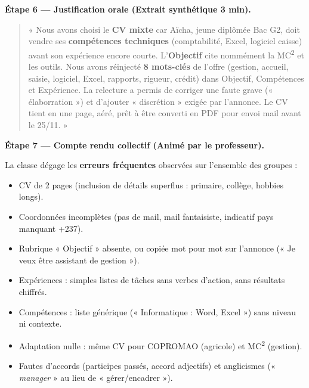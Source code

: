 \documentclass[11pt]{article}
\begin{document}
\begin{exoresolu}
\textbf{Étape 6 — Justification orale (Extrait synthétique 3 min).}

\begin{quote}
« Nous avons choisi le \textbf{CV mixte} car Aïcha, jeune diplômée Bac G2, doit vendre ses \textbf{compétences techniques} (comptabilité, Excel, logiciel caisse) avant son expérience encore courte. L'\textbf{Objectif} cite nommément la MC\textsuperscript{2} et les outils. Nous avons réinjecté \textbf{8 mots-clés} de l'offre (gestion, accueil, saisie, logiciel, Excel, rapports, rigueur, crédit) dans Objectif, Compétences et Expérience. La relecture a permis de corriger une faute grave (« élaborration ») et d'ajouter « discrétion » exigée par l'annonce. Le CV tient en une page, aéré, prêt à être converti en PDF pour envoi mail avant le 25/11. »
\end{quote}

\textbf{Étape 7 — Compte rendu collectif (Animé par le professeur).}

La classe dégage les \textbf{erreurs fréquentes} observées sur l'ensemble des groupes :
\begin{itemize}
\item CV de 2 pages (inclusion de détails superflus : primaire, collège, hobbies longs).
\item Coordonnées incomplètes (pas de mail, mail fantaisiste, indicatif pays manquant +237).
\item Rubrique « Objectif » absente, ou copiée mot pour mot sur l'annonce (« Je veux être assistant de gestion »).
\item Expériences : simples listes de tâches sans verbes d'action, sans résultats chiffrés.
\item Compétences : liste générique (« Informatique : Word, Excel ») sans niveau ni contexte.
\item Adaptation nulle : même CV pour COPROMAO (agricole) et MC\textsuperscript{2} (gestion).
\item Fautes d'accords (participes passés, accord adjectifs) et anglicismes (« \textit{manager} » au lieu de « gérer/encadrer »).
\end{itemize}


\end{exoresolu}
\end{document}
